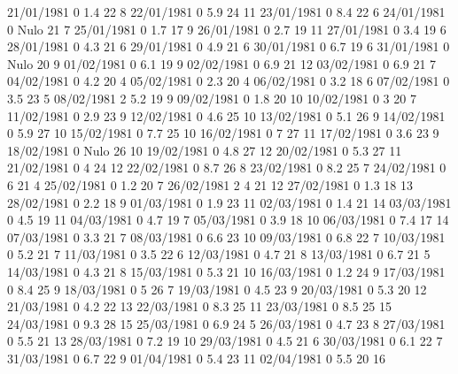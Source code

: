 21/01/1981  0      1.4    22     8 
22/01/1981  0      5.9    24     11 
23/01/1981  0      8.4    22     6 
24/01/1981  0     Nulo    21     7 
25/01/1981  0      1.7    17     9 
26/01/1981  0      2.7    19     11 
27/01/1981  0      3.4    19     6 
28/01/1981  0      4.3    21     6 
29/01/1981  0      4.9    21     6 
30/01/1981  0      6.7    19     6 
31/01/1981  0     Nulo    20     9 
01/02/1981  0      6.1    19     9 
02/02/1981  0      6.9    21     12 
03/02/1981  0      6.9    21     7 
04/02/1981  0      4.2    20     4 
05/02/1981  0      2.3    20     4 
06/02/1981  0      3.2    18     6 
07/02/1981  0      3.5    23     5 
08/02/1981  2      5.2    19     9 
09/02/1981  0      1.8    20     10 
10/02/1981  0      3      20     7 
11/02/1981  0      2.9    23     9 
12/02/1981  0      4.6    25     10 
13/02/1981  0      5.1    26     9 
14/02/1981  0      5.9    27     10 
15/02/1981  0      7.7    25     10 
16/02/1981  0      7      27     11 
17/02/1981  0      3.6    23     9 
18/02/1981  0     Nulo    26     10 
19/02/1981  0      4.8    27     12 
20/02/1981  0      5.3    27     11 
21/02/1981  0      4      24     12 
22/02/1981  0      8.7    26     8 
23/02/1981  0      8.2    25     7 
24/02/1981  0      6      21     4 
25/02/1981  0      1.2    20     7 
26/02/1981  2      4      21     12 
27/02/1981  0      1.3    18     13 
28/02/1981  0      2.2    18     9 
01/03/1981  0      1.9    23     11 
02/03/1981  0      1.4    21     14 
03/03/1981  0      4.5    19     11 
04/03/1981  0      4.7    19     7 
05/03/1981  0      3.9    18     10 
06/03/1981  0      7.4    17     14 
07/03/1981  0      3.3    21     7 
08/03/1981  0      6.6    23     10 
09/03/1981  0      6.8    22     7 
10/03/1981  0      5.2    21     7 
11/03/1981  0      3.5    22     6 
12/03/1981  0      4.7    21     8 
13/03/1981  0      6.7    21     5 
14/03/1981  0      4.3    21     8 
15/03/1981  0      5.3    21     10 
16/03/1981  0      1.2    24     9 
17/03/1981  0      8.4    25     9 
18/03/1981  0      5      26     7 
19/03/1981  0      4.5    23     9 
20/03/1981  0      5.3    20     12 
21/03/1981  0      4.2    22     13 
22/03/1981  0      8.3    25     11 
23/03/1981  0      8.5    25     15 
24/03/1981  0      9.3    28     15 
25/03/1981  0      6.9    24     5 
26/03/1981  0      4.7    23     8 
27/03/1981  0      5.5    21     13 
28/03/1981  0      7.2    19     10 
29/03/1981  0      4.5    21     6 
30/03/1981  0      6.1    22     7 
31/03/1981  0      6.7    22     9 
01/04/1981  0      5.4    23     11 
02/04/1981  0      5.5    20     16 
